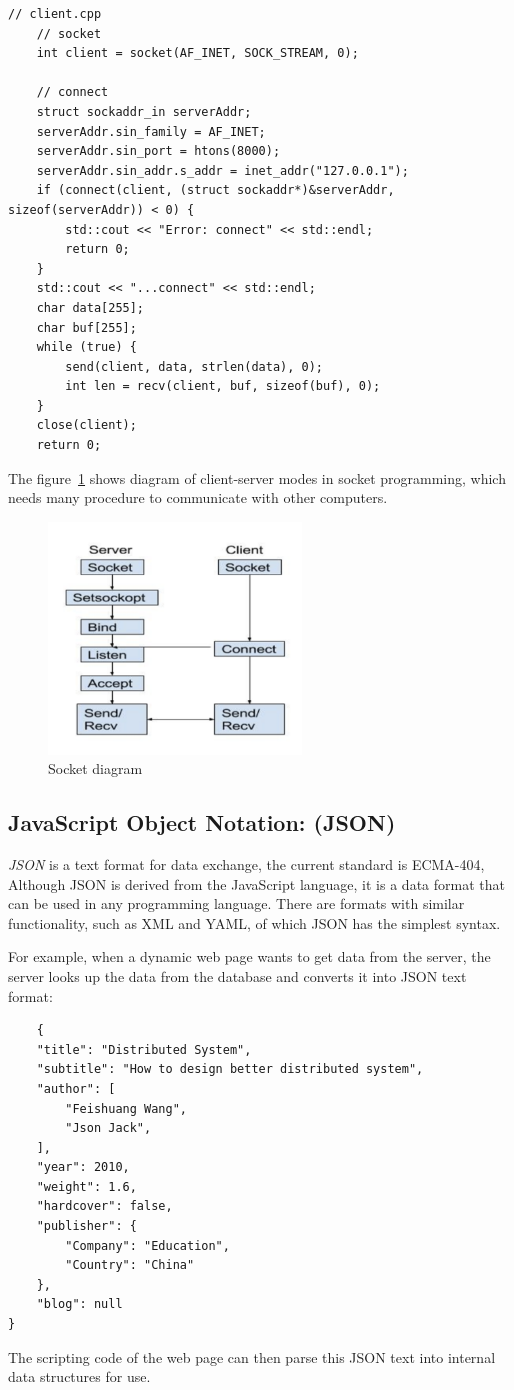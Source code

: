 \documentclass[11pt]{book}
\begin{document}
\begin{lstlisting}
// client.cpp
    // socket
    int client = socket(AF_INET, SOCK_STREAM, 0);

    // connect
    struct sockaddr_in serverAddr;
    serverAddr.sin_family = AF_INET;
    serverAddr.sin_port = htons(8000);
    serverAddr.sin_addr.s_addr = inet_addr("127.0.0.1");
    if (connect(client, (struct sockaddr*)&serverAddr, sizeof(serverAddr)) < 0) {
        std::cout << "Error: connect" << std::endl;
        return 0;
    }
    std::cout << "...connect" << std::endl;
    char data[255];
    char buf[255];
    while (true) {
        send(client, data, strlen(data), 0);
        int len = recv(client, buf, sizeof(buf), 0);
    }
    close(client);
    return 0;
\end{lstlisting}
The figure~\ref{fig:socket} shows diagram of client-server modes in socket programming, which needs many procedure to communicate with 
other computers.
\begin{center}
	\begin{figure}[h]
			\centering
			\includegraphics[width=0.6\textwidth]{socket}
			\caption{Socket diagram}
			\label{fig:socket}
	\end{figure}
	\end{center}
\subsection{JavaScript Object Notation: (JSON)}
\textit{JSON} is a text format for data exchange, the current standard is ECMA-404, 
Although JSON is derived from the JavaScript language, it is a data format that can be used in any programming language. There are formats with similar functionality, such as XML and YAML, of which JSON has the simplest syntax.

For example, when a dynamic web page wants to get data from the server, the server looks up the data from the database and converts it into JSON text format:
\begin{lstlisting}
	{
    "title": "Distributed System",
    "subtitle": "How to design better distributed system",
    "author": [
        "Feishuang Wang",
        "Json Jack",
    ],
    "year": 2010,
    "weight": 1.6,
    "hardcover": false,
    "publisher": {
        "Company": "Education",
        "Country": "China"
    },
    "blog": null
}
\end{lstlisting}
The scripting code of the web page can then parse this JSON text into internal data structures for use.
\end{document}
